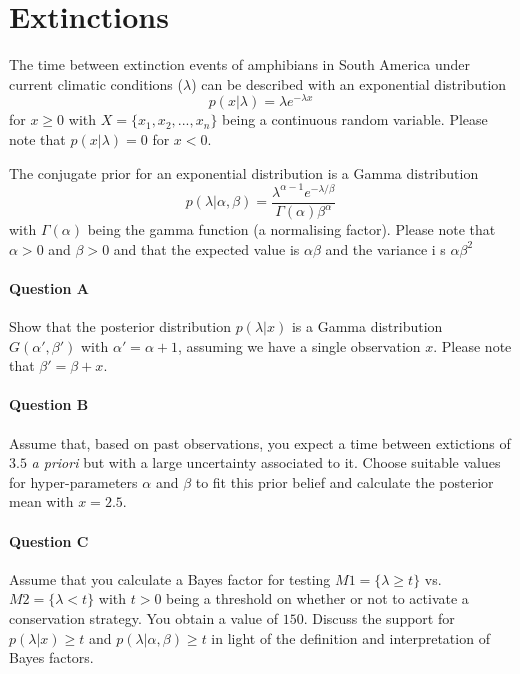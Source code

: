 
\section{Extinctions}

The time between extinction events of amphibians in South America under current climatic conditions ($\lambda$) can be described with an exponential distribution
\begin{equation*}
        p(x|\lambda) = \lambda e^{-\lambda x} 
\end{equation*}
for $x \geq 0$ with $X=\{x_1, x_2, ..., x_n\}$ being a continuous random variable.
Please note that $p(x|\lambda)=0$ for $x<0$.

The conjugate prior for an exponential distribution is a Gamma distribution 
\begin{equation*}
        p(\lambda|\alpha, \beta) = \frac{\lambda^{\alpha-1} e^{-\lambda / \beta} }{ \Gamma(\alpha) \beta^\alpha}
\end{equation*}
with $\Gamma(\alpha)$ being the gamma function (a normalising factor). 
Please note that $\alpha>0$ and $\beta>0$ and that the expected value is $\alpha \beta$ and the variance i
s $\alpha \beta^2$

\paragraph{Question A}

Show that the posterior distribution $p(\lambda|x)$ is a Gamma distribution $G(\alpha', \beta')$ with $\alpha' = \alpha + 1$, assuming we have a single observation $x$. Please note that $\beta' = \beta + x$.

\paragraph{Question B}

Assume that, based on past observations, you expect a time between extictions of $3.5$ \textit{a priori} but with a large uncertainty associated to it.
Choose suitable values for hyper-parameters $\alpha$ and $\beta$ to fit this prior belief and calculate the posterior mean with $x=2.5$.

\paragraph{Question C}

Assume that you calculate a Bayes factor for testing $M1 = \{\lambda \geq t\}$ vs. $M2 = \{\lambda < t\}$ with $t>0$ being a threshold on whether or not to activate a conservation strategy. 
You obtain a value of $150$.
Discuss the support for $p(\lambda | x) \geq t$ and $p(\lambda | \alpha, \beta) \geq t$ in light of the definition and interpretation of Bayes factors.

